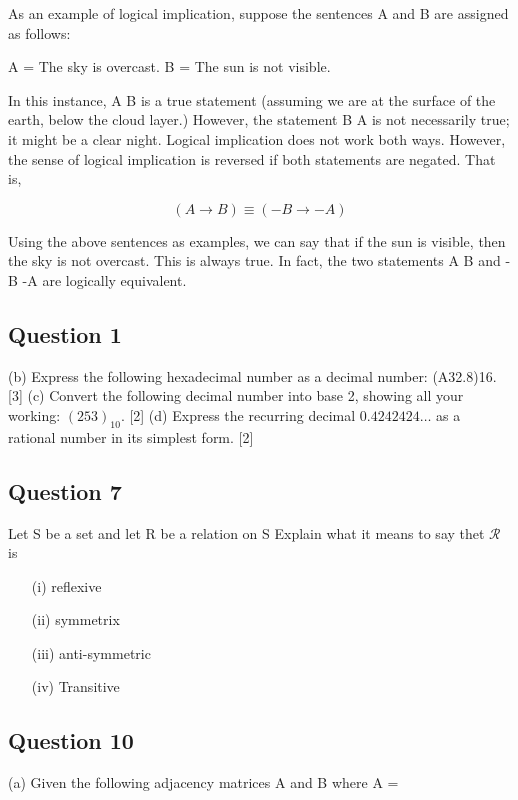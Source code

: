 \documentclass[]{report}
\begin{document}
As an example of logical implication, suppose the sentences A and B are assigned as follows:

A = The sky is overcast.
B = The sun is not visible.

In this instance, A B is a true statement (assuming we are at the surface of the earth, below the cloud layer.) However, the statement B A is not necessarily true; it might be a clear night. Logical implication does not work both ways. However, the sense of logical implication is reversed if both statements are negated. That is,

$$(A \rightarrow B)  \equiv (-B \rightarrow -A)$$

Using the above sentences as examples, we can say that if the sun is visible, then the sky is not overcast. This is always true. In fact, the two statements A B and -B -A are logically equivalent.

\newpage
\subsection*{Question 1}

(b) Express the following hexadecimal number as a decimal number: (A32.8)16.
[3]
(c) Convert the following decimal number into base 2, showing all your working:
$(253)_{10}$. [2]
(d) Express the recurring decimal $0.4242424\ldots$
 as a rational number in its simplest
form. [2]


\subsection*{Question 7}
Let S be a set and let R be a relation on S
Explain what it means to say thet $\mathcal{R}$ is

\begin{itemize}
\item[(i)] reflexive
\item[(ii)] symmetrix
\item[(iii)] anti-symmetric
\item[(iv)] Transitive
\end{itemize}


\subsection{Question 10}

(a) Given the following adjacency matrices A and B where
A =
\end{document}
